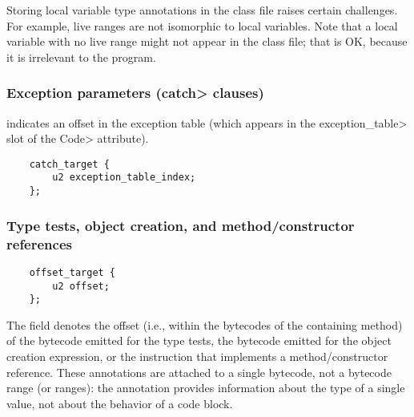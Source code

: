 \documentclass[10pt]{article}
\begin{document}
Storing local variable type annotations in the class file raises certain
challenges.  For example, live ranges are not isomorphic to local
variables.  Note that a local variable with no live range might not appear in
the class file; that is OK, because it is irrelevant to the program.



\subsubsection{Exception parameters (\<catch> clauses)\label{class-file:ext:ri:catch}}

 indicates an offset in the exception table (which
appears in the \<exception\_table> slot of the \<Code> attribute).

\preverbnegspace
\begin{Verbatim}
    catch_target {
        u2 exception_table_index;
    };
\end{Verbatim}



\subsubsection{Type tests, object creation, and method/constructor references\label{class-file:ext:ri:instanceof}\label{class-file:ext:ri:new}\label{class-file:ext:ri:mref-receiver}\label{class-file:ext:ri:cref-receiver}}


\preverbnegspace
\begin{Verbatim}
    offset_target {
        u2 offset;
    };
\end{Verbatim}

The  field denotes the offset (i.e., within the bytecodes
of the containing method) of the  bytecode emitted for the type tests,
the  bytecode emitted for the object creation expression, or the
instruction that implements a method/constructor reference.
These annotations are attached to a single bytecode, not a bytecode range
(or ranges):  the annotation provides information about the type of a
single value, not about the behavior of a code block.
\end{document}

